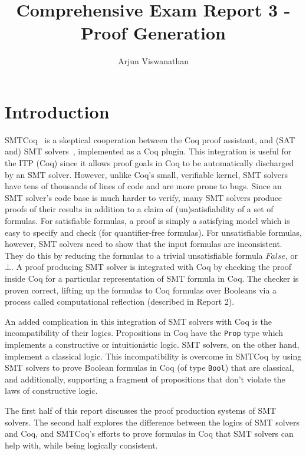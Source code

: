 \documentclass{article}
\begin{document}
\title{Comprehensive Exam Report 3 - Proof Generation}
\author{Arjun Viswanathan}
\date{}
\maketitle

\section{Introduction}
\label{sec:intro}
	SMTCoq~\cite{DBLP:phd/hal/Keller13} 
	is a skeptical cooperation 
	between the Coq proof assistant, and 
	(SAT and) SMT solvers~\cite{Barrett2018}, 
	implemented as a 
	Coq plugin. This integration is 
	useful for the ITP (Coq) since it 
	allows proof goals in Coq to be 
	automatically discharged by an 
	SMT solver. However, unlike 
	Coq's small, verifiable kernel,
	SMT solvers have tens of thousands 
	of lines of code and are more prone
	to bugs. Since an SMT solver's code 
	base is much harder to verify, 
	many SMT solvers produce proofs
	of their results in addition to 
	a claim of (un)satisfiability
	of a set of formulas. For satisfiable 
	formulas, a proof is simply a
	satisfying model which is easy 
	to specify and check (for 
	quantifier-free formulas). For 
	unsatisfiable formulas, however,
	SMT solvers need to show that 
	the input formulas are inconsistent.
	They do this by reducing the formulas 
	to a trivial unsatisfiable formula
	$False$, or $\bot$. A proof 
	producing SMT solver is integrated 
	with Coq by checking the proof 
	inside Coq for a particular 
	representation of SMT formula in 
	Coq. The checker is proven correct,
	lifting up the formulas
	to Coq formulas over Booleans via a
	process called computational 
	reflection (described in Report 2).
	
	An added complication in this 
	integration of SMT solvers with 
	Coq is the incompatibility of 
	their logics. Propositions in 
	Coq have the 
	\texttt{Prop} type which 
	implements a constructive
	or intuitionistic logic. SMT
	solvers, on the other hand, 
	implement a classical logic. This
	incompatibility is overcome in 
	SMTCoq by using SMT solvers to 
	prove Boolean formulas in 
	Coq (of type \texttt{Bool})
	that are classical, and additionally, 
	supporting a fragment of 
	propositions that don't violate 
	the laws of constructive logic.
	
	The first half of this report 
	discusses the proof production 
	systems of SMT solvers. The
	second half explores the difference
	between the logics of SMT solvers
	and Coq, and SMTCoq's efforts 
	to prove formulas in Coq that 
	SMT solvers can help with,
	while being logically consistent.
\end{document}
